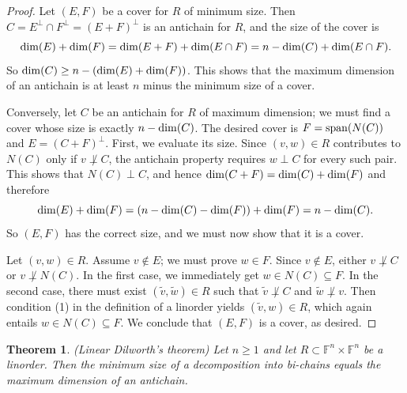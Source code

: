 \documentclass{amsart}
\newtheorem{thm}{Theorem}[section]
\theoremstyle{definition}
\begin{document}
\begin{proof}
Let $(E,F)$ be a cover for $R$ of minimum size. Then $C = E^\perp \cap F^\perp = (E + F)^\perp$ is an antichain for $R$, and the size of the cover is $${\rm dim}(E) + {\rm dim}(F) = {\rm dim}(E + F) + {\rm dim}(E \cap F) = n - {\rm dim}(C) + {\rm dim}(E \cap F).$$ So ${\rm dim}(C) \geq n - ({\rm dim}(E) + {\rm dim}(F))$. This shows that the maximum dimension of an antichain is at least $n$ minus the minimum size of a cover.

Conversely, let $C$ be an antichain for $R$ of maximum dimension; we must find a cover whose size is exactly $n - {\rm dim}(C)$. The desired cover is $F = {\rm span}(N(C))$ and $E = (C + F)^\perp$. First, we evaluate its size. Since $(v,w) \in R$ contributes to $N(C)$ only if $v \not\perp C$, the antichain property requires $w \perp C$ for every such pair. This shows that $N(C) \perp C$, and hence ${\rm dim}(C + F) = {\rm dim}(C) + {\rm dim}(F)$ and therefore $${\rm dim}(E) + {\rm dim}(F) = (n - {\rm dim}(C) - {\rm dim}(F)) + {\rm dim}(F) = n - {\rm dim}(C).$$ So $(E,F)$ has the correct size, and we must now show that it is a cover.

Let $(v,w) \in R$. Assume $v \not\in E$; we must prove $w \in F$. Since $v \not\in E$, either $v \not\perp C$ or $v \not\perp N(C)$. In the first case, we immediately get $w \in N(C) \subseteq F$. In the second case, there must exist $(\tilde{v},\tilde{w}) \in R$ such that $\tilde{v} \not\perp C$ and $\tilde{w} \not\perp v$. Then condition (1) in the definition of a linorder yields $(\tilde{v},w) \in R$, which again entails $w \in N(C) \subseteq F$. We conclude that $(E,F)$ is a cover, as desired.
\end{proof}

\begin{thm}\label{qdt} (Linear Dilworth's theorem)
Let $n \geq 1$ and let $R \subset \mathbb{F}^n \times \mathbb{F}^n$ be a linorder. Then the minimum size of a decomposition into bi-chains equals the maximum dimension of an antichain.
\end{thm}
\end{document}
